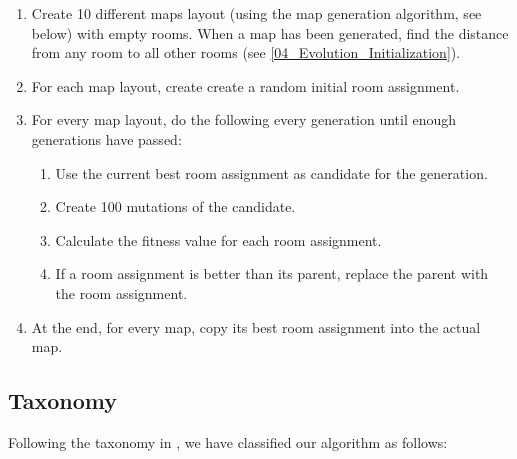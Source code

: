 \begin{enumerate}

	\item Create 10 different maps layout (using the map generation algorithm, see below) with empty rooms. When a map has been generated, find the distance from any room to all other rooms (see \ref{04_Evolution_Initialization}).

	\item For each map layout, create create a random initial room assignment.

	\item For every map layout, do the following every generation until enough generations have passed:

	\begin{enumerate}

		\item Use the current best room assignment as candidate for the generation.

		\item Create 100 mutations of the candidate.

		\item Calculate the fitness value for each room assignment.

		\item If a room assignment is better than its parent, replace the parent with the room assignment.

	\end{enumerate}

	\item At the end, for every map, copy its best room assignment into the actual map.

\end{enumerate}

\subsection{Taxonomy}
\label{04_Taxonomy}

Following the taxonomy in \cite{togelius2010search}, we have classified our algorithm as follows:

